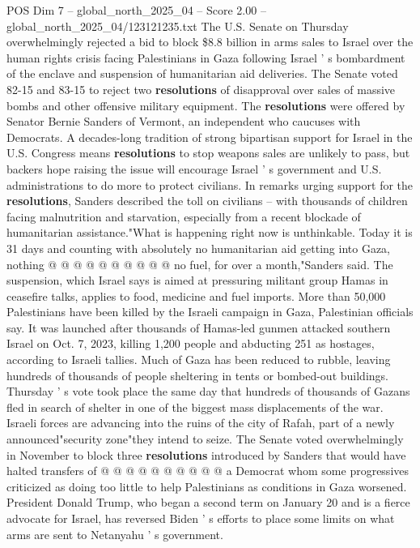 \begin{textsample}{POS Dim 7 – global\_north\_2025\_04 – Score 2.00 – global\_north\_2025\_04/123121235.txt}  \label{ex:f7_pos_353}
The U.S.
Senate on Thursday overwhelmingly rejected a bid to block \$8.8 billion in arms sales to Israel over the human rights crisis facing Palestinians in Gaza following Israel ' s bombardment of the enclave and suspension of humanitarian aid deliveries.
The Senate voted 82-15 and 83-15 to reject two \textbf{resolutions} of disapproval over sales of massive bombs and other offensive military equipment.
The \textbf{resolutions} were offered by Senator Bernie Sanders of Vermont, an independent who caucuses with Democrats.
A decades-long tradition of strong bipartisan support for Israel in the U.S.
Congress means \textbf{resolutions} to stop weapons sales are unlikely to pass, but backers hope raising the issue will encourage Israel ' s government and U.S. administrations to do more to protect civilians.
In remarks urging support for the \textbf{resolutions}, Sanders described the toll on civilians -- with thousands of children facing malnutrition and starvation, especially from a recent blockade of humanitarian assistance."What is happening right now is unthinkable.
Today it is 31 days and counting with absolutely no humanitarian aid getting into Gaza, nothing @ @ @ @ @ @ @ @ @ @ no fuel, for over a month,"Sanders said.
The suspension, which Israel says is aimed at pressuring militant group Hamas in ceasefire talks, applies to food, medicine and fuel imports.
More than 50,000 Palestinians have been killed by the Israeli campaign in Gaza, Palestinian officials say.
It was launched after thousands of Hamas-led gunmen attacked southern Israel on Oct. 7, 2023, killing 1,200 people and abducting 251 as hostages, according to Israeli tallies.
Much of Gaza has been reduced to rubble, leaving hundreds of thousands of people sheltering in tents or bombed-out buildings.
Thursday ' s vote took place the same day that hundreds of thousands of Gazans fled in search of shelter in one of the biggest mass displacements of the war.
Israeli forces are advancing into the ruins of the city of Rafah, part of a newly announced"security zone"they intend to seize.
The Senate voted overwhelmingly in November to block three \textbf{resolutions} introduced by Sanders that would have halted transfers of @ @ @ @ @ @ @ @ @ @ a Democrat whom some progressives criticized as doing too little to help Palestinians as conditions in Gaza worsened.
President Donald Trump, who began a second term on January 20 and is a fierce advocate for Israel, has reversed Biden ' s efforts to place some limits on what arms are sent to Netanyahu ' s government.

\end{textsample}
